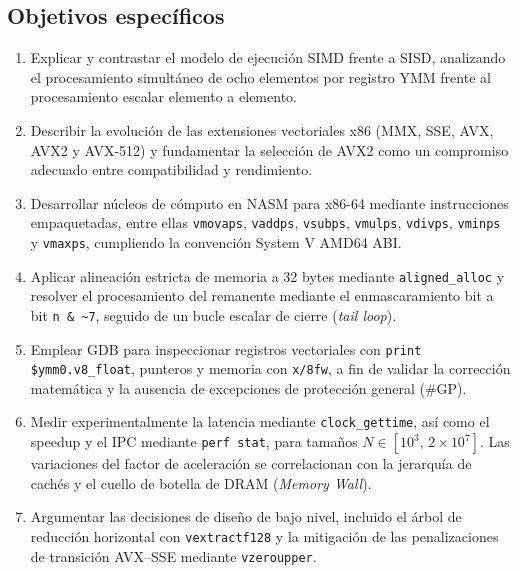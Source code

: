 \documentclass[journal]{IEEEtran}
\begin{document}
\subsection{Objetivos específicos}
\begin{enumerate}
  \item[OA1.] Explicar y contrastar el modelo de ejecución SIMD frente a SISD,
  analizando el procesamiento simultáneo de ocho elementos por registro YMM
  frente al procesamiento escalar elemento a elemento.

  \item[OA2.] Describir la evolución de las extensiones vectoriales x86
  (MMX, SSE, AVX, AVX2 y AVX-512) y fundamentar la selección de AVX2 como un
  compromiso adecuado entre compatibilidad y rendimiento.

  \item[OA3.] Desarrollar núcleos de cómputo en NASM para x86-64 mediante
  instrucciones empaquetadas, entre ellas \texttt{vmovaps}, \texttt{vaddps},
  \texttt{vsubps}, \texttt{vmulps}, \texttt{vdivps}, \texttt{vminps} y
  \texttt{vmaxps}, cumpliendo la convención System V AMD64 ABI.

  \item[OA4.] Aplicar alineación estricta de memoria a 32 bytes mediante
  \texttt{aligned\_alloc} y resolver el procesamiento del remanente mediante el
  enmascaramiento bit a bit \texttt{n \& \textasciitilde 7}, seguido de un
  bucle escalar de cierre (\textit{tail loop}).

  \item[OA5.] Emplear GDB para inspeccionar registros vectoriales con
  \texttt{print \$ymm0.v8\_float}, punteros y memoria con \texttt{x/8fw}, a fin
  de validar la corrección matemática y la ausencia de excepciones de protección
  general (\#GP).

  \item[OA6.] Medir experimentalmente la latencia mediante
  \texttt{clock\_gettime}, así como el speedup y el IPC mediante
  \texttt{perf stat}, para tamaños
  $N\in[10^3,\,2\times10^7]$. Las variaciones del factor de aceleración se
  correlacionan con la jerarquía de cachés y el cuello de botella de DRAM
  (\textit{Memory Wall}).

  \item[OA7.] Argumentar las decisiones de diseño de bajo nivel, incluido el
  árbol de reducción horizontal con \texttt{vextractf128} y la mitigación de
  las penalizaciones de transición AVX--SSE mediante \texttt{vzeroupper}.
\end{enumerate}
\end{document}
